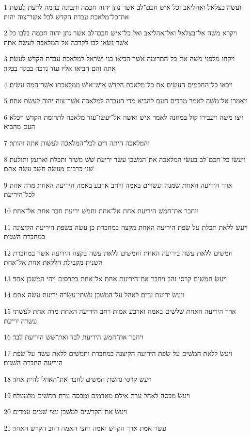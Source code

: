 \par 1 ועשׂה בצלאל ואהליאב וכל אישׁ חכם־לב אשׁר נתן יהוה חכמה ותבונה בהמה לדעת לעשׂת את־כל־מלאכת עבדת הקדשׁ לכל אשׁר־צוה יהוה׃
\par 2 ויקרא משׁה אל־בצלאל ואל־אהליאב ואל כל־אישׁ חכם־לב אשׁר נתן יהוה חכמה בלבו כל אשׁר נשׂאו לבו לקרבה אל־המלאכה לעשׂת אתה׃
\par 3 ויקחו מלפני משׁה את כל־התרומה אשׁר הביאו בני ישׂראל למלאכת עבדת הקדשׁ לעשׂת אתה והם הביאו אליו עוד נדבה בבקר בבקר׃
\par 4 ויבאו כל־החכמים העשׂים את כל־מלאכת הקדשׁ אישׁ־אישׁ ממלאכתו אשׁר־המה עשׂים׃
\par 5 ויאמרו אל־משׁה לאמר מרבים העם להביא מדי העבדה למלאכה אשׁר־צוה יהוה לעשׂת אתה׃
\par 6 ויצו משׁה ויעבירו קול במחנה לאמר אישׁ ואשׁה אל־יעשׂו־עוד מלאכה לתרומת הקדשׁ ויכלא העם מהביא׃
\par 7 והמלאכה היתה דים לכל־המלאכה לעשׂות אתה והותר׃
\par 8 ויעשׂו כל־חכם־לב בעשׂי המלאכה את־המשׁכן עשׂר יריעת שׁשׁ משׁזר ותכלת וארגמן ותולעת שׁני כרבים מעשׂה חשׁב עשׂה אתם׃
\par 9 ארך היריעה האחת שׁמנה ועשׂרים באמה ורחב ארבע באמה היריעה האחת מדה אחת לכל־היריעת׃
\par 10 ויחבר את־חמשׁ היריעת אחת אל־אחת וחמשׁ יריעת חבר אחת אל־אחת׃
\par 11 ויעשׂ ללאת תכלת על שׂפת היריעה האחת מקצה במחברת כן עשׂה בשׂפת היריעה הקיצונה במחברת השׁנית׃
\par 12 חמשׁים ללאת עשׂה ביריעה האחת וחמשׁים ללאת עשׂה בקצה היריעה אשׁר במחברת השׁנית מקבילת הללאת אחת אל־אחת׃
\par 13 ויעשׂ חמשׁים קרסי זהב ויחבר את־היריעת אחת אל־אחת בקרסים ויהי המשׁכן אחד׃
\par 14 ויעשׂ יריעת עזים לאהל על־המשׁכן עשׁתי־עשׂרה יריעת עשׂה אתם׃
\par 15 ארך היריעה האחת שׁלשׁים באמה וארבע אמות רחב היריעה האחת מדה אחת לעשׁתי עשׂרה יריעת׃
\par 16 ויחבר את־חמשׁ היריעת לבד ואת־שׁשׁ היריעת לבד׃
\par 17 ויעשׂ ללאת חמשׁים על שׂפת היריעה הקיצנה במחברת וחמשׁים ללאת עשׂה על־שׂפת היריעה החברת השׁנית׃
\par 18 ויעשׂ קרסי נחשׁת חמשׁים לחבר את־האהל להית אחד׃
\par 19 ויעשׂ מכסה לאהל ערת אילם מאדמים ומכסה ערת תחשׁים מלמעלה׃
\par 20 ויעשׂ את־הקרשׁים למשׁכן עצי שׁטים עמדים׃
\par 21 עשׂר אמת ארך הקרשׁ ואמה וחצי האמה רחב הקרשׁ האחד׃
